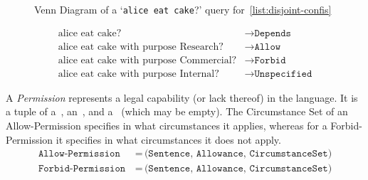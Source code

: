 \begin{figure}[h]

    \centering

    \caption[Venn diagram of query for disjoint circumstances agreement]
    {Venn Diagram of a `\texttt{alice eat cake}?' query for~\autoref{list:disjoint-confis}}
    \label{fig:allowance-venn}
\end{figure}

\begin{align}
    \label{eq:allowance-cake-example}
    \text{alice eat cake?} &\to \texttt{Depends}\\
    \text{alice eat cake with purpose Research?} &\to \texttt{Allow}\\
    \text{alice eat cake with purpose Commercial?} &\to \texttt{Forbid}\\
    \text{alice eat cake with purpose Internal?} &\to \texttt{Unspecified}
\end{align}


\begin{definition}[Permission]
    \label{def:permission} A \emph{Permission} represents a legal capability (or lack thereof) in the language.
    It is a tuple of a~, an~, and a~ (which may be empty).
    The Circumstance Set of an Allow-Permission specifies in what circumstances it applies, whereas for a Forbid-Permission it specifies in what circumstances it does not apply.
    \begin{align}
        \nonumber \texttt{Allow-Permission}\, &=\, \texttt{(Sentence, Allowance, CircumstanceSet)}\\
        \nonumber \texttt{Forbid-Permission}\, &=\, \texttt{(Sentence, Allowance, CircumstanceSet)}
    \end{align}
\end{definition}

